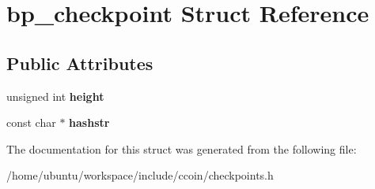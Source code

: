 \hypertarget{structbp__checkpoint}{\section{bp\-\_\-checkpoint Struct Reference}
\label{structbp__checkpoint}
}
\subsection*{Public Attributes}
\begin{DoxyCompactItemize}
\item 
\hypertarget{structbp__checkpoint_a3180e88809576e6de38e5fb0ddb7ed16}{unsigned int {\bfseries height}}\label{structbp__checkpoint_a3180e88809576e6de38e5fb0ddb7ed16}

\item 
\hypertarget{structbp__checkpoint_a1dbd16b8e4621650fdb8825999776920}{const char $\ast$ {\bfseries hashstr}}\label{structbp__checkpoint_a1dbd16b8e4621650fdb8825999776920}

\end{DoxyCompactItemize}


The documentation for this struct was generated from the following file\-:\begin{DoxyCompactItemize}
\item 
/home/ubuntu/workspace/include/ccoin/checkpoints.\-h\end{DoxyCompactItemize}
